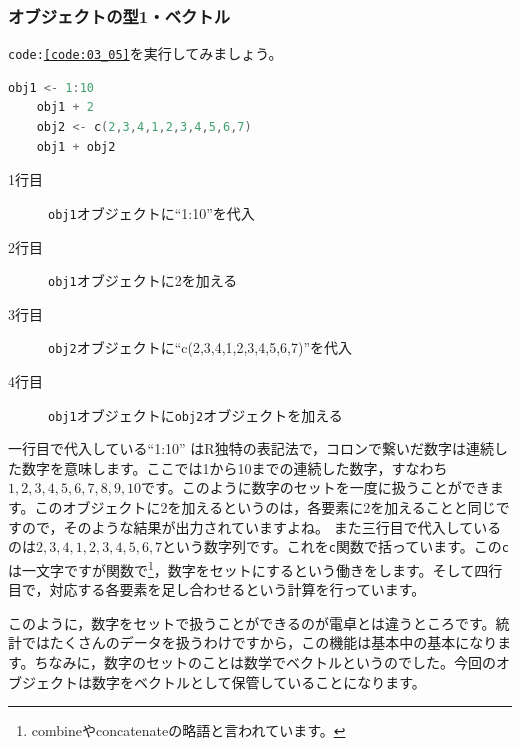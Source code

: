 \documentclass{ltjsbook}
\begin{document}
\subsubsection{オブジェクトの型1・ベクトル}
\texttt{code:\ref{code:03_05}}を実行してみましょう。
\begin{lstlisting}[language=c++,label={code:03_05},caption={ベクトル処理}]
	obj1 <- 1:10
	obj1 + 2
	obj2 <- c(2,3,4,1,2,3,4,5,6,7)
	obj1 + obj2
\end{lstlisting}

\begin{description}
	\item[1行目] \texttt{obj1}オブジェクトに``1:10''を代入
	\item[2行目] \texttt{obj1}オブジェクトに2を加える
	\item[3行目] \texttt{obj2}オブジェクトに``c(2,3,4,1,2,3,4,5,6,7)''を代入
	\item[4行目] \texttt{obj1}オブジェクトに\texttt{obj2}オブジェクトを加える
\end{description}

一行目で代入している``1:10'' はR独特の表記法で，コロンで繋いだ数字は連続した数字を意味します。ここでは1から10までの連続した数字，すなわち$1,2,3,4,5,6,7,8,9,10$です。このように数字のセットを一度に扱うことができます。このオブジェクトに2を加えるというのは，各要素に2を加えることと同じですので，そのような結果が出力されていますよね。
また三行目で代入しているのは$2,3,4,1,2,3,4,5,6,7$という数字列です。これを\texttt{c}関数で括っています。この\texttt{c}は一文字ですが関数で\footnote{combineやconcatenateの略語と言われています。}，数字をセットにするという働きをします。そして四行目で，対応する各要素を足し合わせるという計算を行っています。

このように，数字をセットで扱うことができるのが電卓とは違うところです。統計ではたくさんのデータを扱うわけですから，この機能は基本中の基本になります。ちなみに，数字のセットのことは数学でベクトルというのでした。今回のオブジェクトは数字をベクトルとして保管していることになります。
\end{document}

